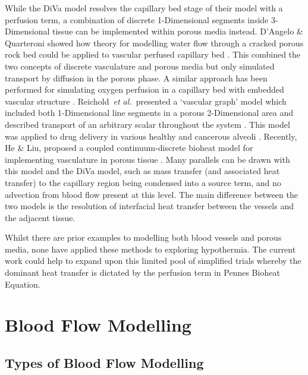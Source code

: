 \documentclass[11pt,english,a4paper,twoside,openright]{report}
\begin{document}
{{{{{{{{	While the DiVa model resolves the capillary bed stage of their model with a perfusion term, a combination of discrete 1-Dimensional segments inside 3-Dimensional tissue can be implemented within porous media instead. D'Angelo \& Quarteroni showed how theory for modelling water flow through a cracked porous rock bed could be applied to vascular perfused capillary bed \cite{d2008coupling}. This combined the two concepts of discrete vasculature and porous media but only simulated transport by diffusion in the porous phase. A similar approach has been performed for simulating oxygen perfusion in a capillary bed with embedded vascular structure \cite{secomb2000theoretical}\cite{secomb2004green}. Reichold~\textit{et al.\ }presented a `vascular graph' model which included both 1-Dimensional line segments in a porous 2-Dimensional area and described transport of an arbitrary scalar throughout the system \cite{reichold2009vascular}. This model was applied to drug delivery in various healthy and cancerous alveoli \cite{erbertseder2012coupled}. Recently, He \& Liu, proposed a coupled continuum-discrete bioheat model for implementing vasculature in porous tissue \cite{he2017coupled}. Many parallels can be drawn with this model and the DiVa model, such as mass transfer (and associated heat transfer) to the capillary region being condensed into a source term, and no advection from blood flow present at this level. The main difference between the two models is the resolution of interfacial heat transfer between the vessels and the adjacent tissue.
	
	Whilst there are prior examples to modelling both blood vessels and porous media, none have applied these methods to exploring hypothermia. The current work could help to expand upon this limited pool of simplified trials whereby the dominant heat transfer is dictated by the perfusion term in Pennes Bioheat Equation. 
	
	\section[Blood Flow Modelling]{{\Large B}lood {\Large F}low {\Large M}odelling}
	
	\subsection{Types of Blood Flow Modelling}
	
}}}}}}}}
\end{document}
